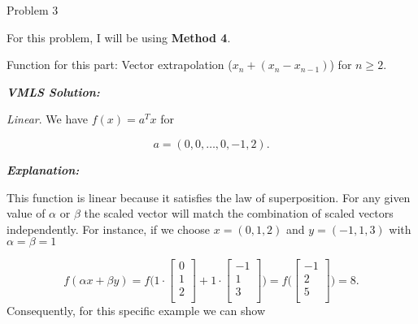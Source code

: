 \begin{problem}{Problem 3}
    \begin{Highlight}
        For this problem, I will be using \textbf{Method 4}. \vspace*{1em}

        Function for this part: Vector extrapolation ($x_{n} + (x_{n} - x_{n-1})$) for $n \geq 2$. \vspace*{1em}

        \textbf{\textit{VMLS Solution:}} \vspace*{1em}

        \textit{Linear}. We have $f(x) = a^{T}x$ for 
        
        \begin{equation}
            a = (0,0,\dots,0,-1,2).
        \end{equation}

        \textbf{\textit{Explanation:}} \vspace*{1em}

        This function is linear because it satisfies the law of superposition. For any given value of $\alpha$ or $\beta$ the scaled vector will match the combination of scaled vectors independently.
        For instance, if we choose $x = (0,1,2)$ and $y = (-1,1,3)$ with $\alpha = \beta = 1$

        \begin{equation}
            f(\alpha x + \beta y) = f \Bigg(
                1 \cdot 
                \begin{bmatrix}
                    0 \\
                    1 \\
                    2 \\
                \end{bmatrix}
                + 1 \cdot 
                \begin{bmatrix}
                    -1 \\
                    1 \\
                    3 \\
                \end{bmatrix}
                \Bigg) = f \Bigg(
                \begin{bmatrix}
                    -1 \\
                    2 \\
                    5 \\
                \end{bmatrix}
                \Bigg) = 8.
        \end{equation}
        Consequently, for this specific example we can show


\end{Highlight}
\end{problem}
